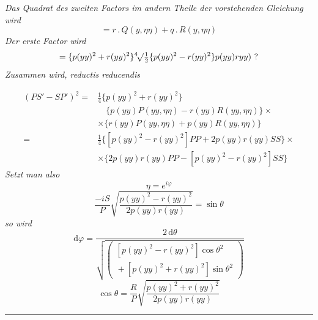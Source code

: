 \textit{Das Quadrat des zweiten Factors im andern Theile der vorstehenden Gleichung wird}
\[
=r\mathbin{.}Q(y,\eta\eta)+q\mathbin{.}R(y,\eta\eta)
\]
\textit{Der erste Factor wird}
\[
=\{p(yy)^2+r(yy)^2\}{}^4\!\surd \tfrac12
 \{p(yy)^2-r(yy)^2\}p(yy)ryy)\ ?
\]
\textit{Zusammen wird, reductis reducendis}



\[
\begin{aligned}
(PS'-SP')^2={}&\tfrac14\{p(yy)^2+r(yy)^2\}\\[6pt]&\quad\{p(yy)P(yy,\eta\eta)-r(yy)R(yy,\eta\eta)\}\times\\
&\times\{r(yy)P(yy,\eta\eta)+p(yy)R(yy,\eta\eta)\}\\[10pt]
={}&\tfrac14\{[p(yy)^2-r(yy)^2]PP+2p(yy)r(yy)SS\}\times\\
&\times\{2p(yy)r(yy)PP-[p(yy)^2-r(yy)^2]SS\}
\end{aligned}
\]
\textit{Setzt man also}
\[
\eta=e^{i\varphi}
\]
\[
\dfrac{-iS}{P}\surd {\dfrac{p(yy)^2-r(yy)^2}{2p(yy)r(yy)}}=\sin\theta
\]
\textit{so wird}
\[
\mathrm d\varphi=
\dfrac{2\,\mathrm d\theta}
 {\surd {\left(\begin{gathered}{}[p(yy)^2-r(yy)^2]\cos\theta^2\\[3pt]{}+
[p(yy)^2+r(yy)^2]\sin\theta^2\end{gathered}\right)}}
\]
\[
\cos\theta=\dfrac RP\surd {\dfrac{p(yy)^2+r(yy)^2}{2p(yy)r(yy)}}
\]
\begin{center}\rule{0.23\textwidth}{0.3pt}\end{center}
